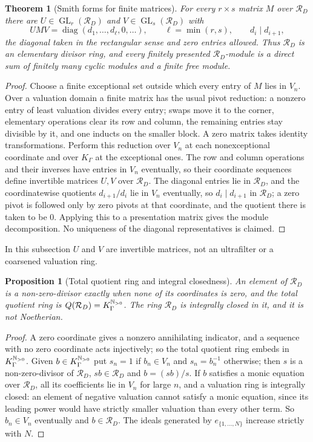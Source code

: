 \documentclass[11pt]{article}
\newtheorem{theorem}{Theorem}[section]
\theoremstyle{plain}
\theoremstyle{plain}
\newtheorem{proposition}[proposition]{Proposition}
\theoremstyle{plain}
\theoremstyle{definition}
\theoremstyle{definition}
\theoremstyle{definition}
\theoremstyle{definition}
\theoremstyle{remark}
\newcommand{\RD}{\mathcal R_D}\newcommand{\Ucal}{\mathcal U}
\begin{document}
\begin{theorem}[Smith forms for finite matrices]\label{ent:ps:thm:smith}
For every $r\times s$ matrix $M$ over $\RD$ there are
$U\in\operatorname{GL}_r(\RD)$ and $V\in\operatorname{GL}_s(\RD)$ with
\[
 UMV=\operatorname{diag}(d_1,\ldots,d_\ell,0,\ldots),\qquad
 \ell=\min(r,s),\qquad d_i\mid d_{i+1},
\]
the diagonal taken in the rectangular sense and zero entries allowed. Thus
$\RD$ is an elementary divisor ring, and every finitely presented
$\RD$-module is a direct sum of finitely many cyclic modules and a finite
free module.
\end{theorem}
\begin{proof}
Choose a finite exceptional set outside which every entry of $M$ lies in
$V_n$. Over a valuation domain a finite matrix has the usual pivot
reduction: a nonzero entry of least valuation divides every entry; swaps move
it to the corner, elementary operations clear its row and column, the
remaining entries stay divisible by it, and one inducts on the smaller block.
A zero matrix takes identity transformations. Perform this reduction over
$V_n$ at each nonexceptional coordinate and over $K_\Gamma$ at the
exceptional ones. The row and column operations and their inverses have
entries in $V_n$ eventually, so their coordinate sequences define invertible
matrices $U,V$ over $\RD$. The diagonal entries lie in $\RD$, and the
coordinatewise quotients $d_{i+1}/d_i$ lie in $V_n$ eventually, so
$d_i\mid d_{i+1}$ in $\RD$; a zero pivot is followed only by zero pivots at
that coordinate, and the quotient there is taken to be $0$. Applying this to
a presentation matrix gives the module decomposition. No uniqueness of the
diagonal representatives is claimed.
\end{proof}

In this subsection $U$ and $V$ are invertible matrices, not an ultrafilter or
a coarsened valuation ring.

\begin{proposition}[Total quotient ring and integral closedness]
\label{ent:ps:prop:total-quotient}
An element of $\RD$ is a non-zero-divisor exactly when none of its
coordinates is zero, and the total quotient ring is
$Q(\RD)=K_\Gamma^{\N_{>0}}$. The ring $\RD$ is integrally closed in it, and
it is not Noetherian.
\end{proposition}
\begin{proof}
A zero coordinate gives a nonzero annihilating indicator, and a sequence with
no zero coordinate acts injectively; so the total quotient ring embeds in
$K_\Gamma^{\mathbb N_{>0}}$. Given $b\in K_\Gamma^{\mathbb N_{>0}}$ put $s_n=1$ if
$b_n\in V_n$ and $s_n=b_n^{-1}$ otherwise; then $s$ is a non-zero-divisor of
$\RD$, $sb\in\RD$ and $b=(sb)/s$. If $b$ satisfies a monic equation over
$\RD$, all its coefficients lie in $V_n$ for large $n$, and a valuation ring
is integrally closed: an element of negative valuation cannot satisfy a monic
equation, since its leading power would have strictly smaller valuation than
every other term. So $b_n\in V_n$ eventually and $b\in\RD$. The ideals
generated by $e_{\{1,\ldots,N\}}$ increase strictly with $N$.
\end{proof}
\end{document}
